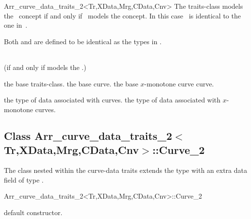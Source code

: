 \begin{ccRefClass}{Arr_curve_data_traits_2<Tr,XData,Mrg,CData,Cnv>}
The traits-class models the~ concept
if and only if ~models the concept.
In this case~ is
identical to the one in~.

Both  and  are defined
to be identical as the types in .


 
\ccIsModel
     \\
     (if and only if  models the
    .) \\

\ccTypes

    {the base traits-class.}
\ccGlue
{}
    {the base curve.}
\ccGlue
{}
    {the base $x$-monotone curve curve.}

\ccGlue
{}

    {the type of data associated with curves.}
\ccGlue
{}
    {the type of data associated with $x$-monotone curves.}

\ccInheritsFrom

\subsection*{Class Arr\_curve\_data\_traits\_2$<$Tr,XData,Mrg,CData,Cnv$>$::Curve\_2}

The  class nested within the curve-data traits
extends the  type with an extra data field of type
.

\begin{ccClass}{Arr_curve_data_traits_2<Tr,XData,Mrg,CData,Cnv>::Curve_2}

\ccInheritsFrom

\ccCreation
{}

    {default constructor.}


\end{ccClass}
\end{ccRefClass}
